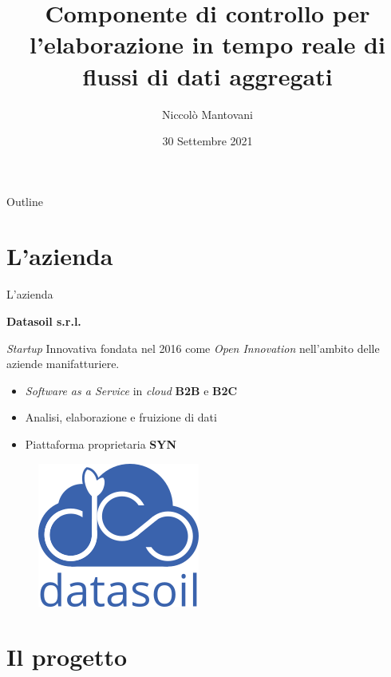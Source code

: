 \documentclass{beamer}
\title{Componente di controllo per l'elaborazione in tempo reale di flussi di dati aggregati}
\author{Niccolò Mantovani}
\date{30 Settembre 2021}
\begin{document}
	\maketitle

	\begin{frame}{Outline}
		\tableofcontents
	\end{frame}


	\section{L'azienda}

	\begin{frame}{L'azienda}

		\textbf{Datasoil s.r.l.} \vspace{.2em}
		
		\textit{Startup} Innovativa fondata nel 2016 come \textit{Open Innovation} nell’ambito delle aziende manifatturiere. \vspace{.2em}
		
		\begin{itemize}
			\item \textit{Software as a Service} in \textit{cloud} \textbf{B2B} e \textbf{B2C} \vspace{.5em}
			\item Analisi, elaborazione e fruizione di dati \vspace{.5em}
			\item Piattaforma proprietaria \textbf{SYN}
		\end{itemize}
		
		\begin{figure}[!h] 
    		\centering 
    		\includegraphics[width=0.2\columnwidth]{../immagini/ds_logo.png}
		\end{figure}

	\end{frame}

	\section{Il progetto}
\end{document}
